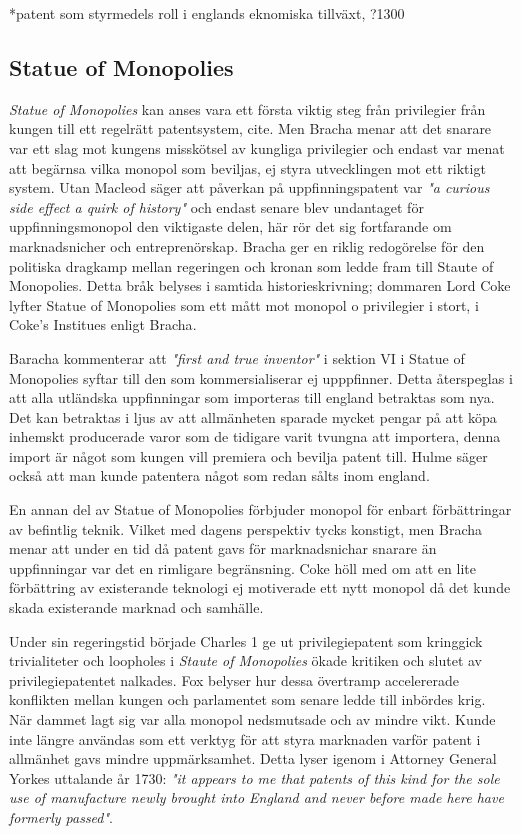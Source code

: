 *patent som styrmedels roll i englands eknomiska tillväxt, ?1300

\subsection{Statue of Monopolies} 
\label{sub:statue_of_monopolies}

\emph{Statue of Monopolies} kan anses vara ett första viktig steg från privilegier från kungen till ett
regelrätt patentsystem, cite. Men Bracha\cite{bracha} menar att det snarare var ett slag mot kungens misskötsel av kungliga privilegier
och endast var menat att begärnsa vilka monopol som beviljas, ej styra utvecklingen mot ett riktigt
system. Utan Macleod \cite{macleod2} säger att påverkan på uppfinningspatent  var \emph{"a curious side effect a quirk of history"} och endast
senare blev undantaget för uppfinningsmonopol den viktigaste delen, här rör det sig fortfarande om marknadsnicher och entreprenörskap. Bracha ger en riklig redogörelse för den politiska dragkamp mellan regeringen och kronan som ledde fram till Staute of Monopolies. Detta bråk belyses i samtida historieskrivning; dommaren Lord Coke lyfter Statue of Monopolies som ett mått mot monopol o privilegier i stort, i Coke's Institues \cite{coke} enligt Bracha\cite{bracha}.

Baracha kommenterar att \emph{"first and true inventor"} i sektion VI i Statue of Monopolies syftar till den som kommersialiserar ej upppfinner. Detta återspeglas i att alla utländska uppfinningar som importeras till england betraktas som nya\cite{bracha}. Det kan betraktas i ljus av att allmänheten sparade mycket pengar på att köpa inhemskt producerade varor som de tidigare varit tvungna att importera, denna import är något som kungen vill premiera och bevilja patent till. Hulme\cite{hulme2} säger också att man kunde patentera något som redan sålts inom england.  

En annan del av Statue of Monopolies förbjuder monopol för enbart förbättringar av befintlig teknik. Vilket med dagens perspektiv tycks konstigt, men Bracha\cite{bracha} menar att under en tid då patent gavs för marknadsnichar snarare än uppfinningar var det en rimligare begränsning.
Coke höll med om att en lite förbättring av existerande teknologi ej motiverade ett nytt monopol då det kunde skada existerande marknad och samhälle\cite{bracha}.

Under sin regeringstid började Charles 1 ge ut privilegiepatent som kringgick trivialiteter och loopholes i \emph{Staute of
Monopolies} ökade kritiken och slutet av privilegiepatentet nalkades\cite{bracha}. Fox \cite{Fox} belyser hur dessa övertramp accelererade
konflikten mellan kungen och parlamentet som senare ledde till inbördes krig. När dammet lagt sig
var alla monopol nedsmutsade och av mindre vikt. Kunde inte längre användas som ett verktyg för att styra
marknaden varför patent i allmänhet gavs mindre uppmärksamhet. Detta lyser igenom i Attorney General Yorkes uttalande år 1730: \emph{"it appears to me that patents of this kind for the sole use of manufacture newly brought into England and never before made here have formerly passed"}\cite{macleod2}. 

